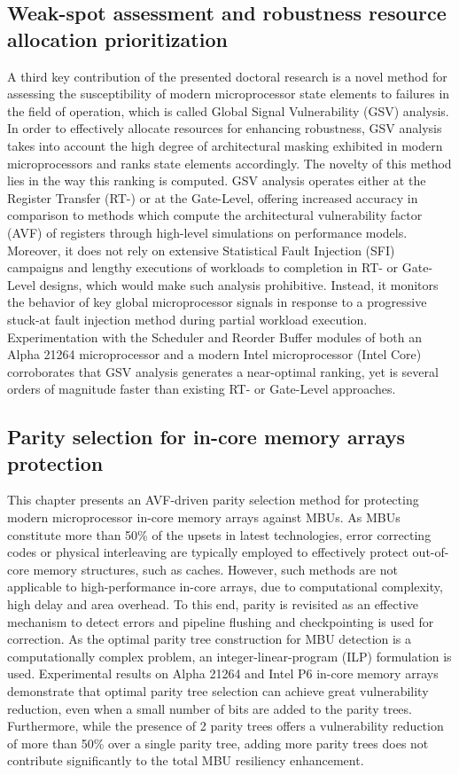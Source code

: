 \documentclass[12pt]{yalephd}
\begin{document}
\subsection{Weak-spot assessment and robustness resource allocation prioritization}
A third key contribution of the presented doctoral research is a novel method for assessing the susceptibility of modern microprocessor state elements to failures in the field of operation, which is called Global Signal Vulnerability (GSV) analysis. In order to effectively allocate resources for enhancing robustness, GSV analysis takes into account the high degree of architectural masking exhibited in modern microprocessors and ranks state elements accordingly. The novelty of this method lies in the way this ranking is computed. GSV analysis operates either at the Register Transfer (RT-) or at the Gate-Level, offering increased accuracy in comparison to methods which compute the architectural vulnerability factor (AVF) of registers through high-level simulations on performance models. Moreover, it does not rely on extensive Statistical Fault Injection (SFI) campaigns and lengthy executions of workloads to completion in RT- or Gate-Level designs, which would make such analysis prohibitive. Instead, it monitors the behavior of key global microprocessor signals in response to a progressive stuck-at fault injection method during partial workload execution. Experimentation with the Scheduler and Reorder Buffer modules of both an Alpha 21264 microprocessor and a modern Intel microprocessor (Intel Core) corroborates that GSV analysis generates a near-optimal ranking, yet is several orders of magnitude faster than existing RT- or Gate-Level approaches.

\subsection{Parity selection for in-core memory arrays protection}

This chapter presents an AVF-driven parity selection method for protecting modern microprocessor in-core memory arrays against MBUs. As MBUs constitute more than 50\% of the upsets in latest technologies, error correcting codes or physical interleaving are typically employed to effectively protect out-of-core memory structures, such as caches. However, such methods are not applicable to high-performance in-core arrays, due to computational complexity, high delay and area overhead. To this end, parity is revisited as an effective mechanism to detect errors and pipeline flushing and checkpointing is used for correction. As the optimal parity tree construction for MBU detection is a computationally complex problem, an integer-linear-program (ILP) formulation is used. Experimental results on Alpha 21264 and Intel P6 in-core memory arrays demonstrate that optimal parity tree selection can achieve great vulnerability reduction, even when a small number of bits are added to the parity trees. Furthermore, while the presence of 2 parity trees offers a vulnerability reduction of more than 50\%  over a single parity tree, adding more parity trees does not contribute significantly to the total MBU resiliency enhancement.
\end{document}
